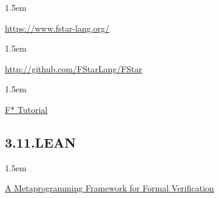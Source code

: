 \documentclass[12pt,twoside]{article}
\begin{document}
\begin{mddefinitions}%


\begin{mdbmarginx}{}{}{}{1.5em}%
\begin{mddefdata}%
\href{https://www.fstar-lang.org/}{{\ttfamily https://\hspace{0pt}www.\hspace{0pt}fstar-\hspace{0pt}lang.\hspace{0pt}org/\hspace{0pt}}}
\end{mddefdata}%
\end{mdbmarginx}%


\begin{mdbmarginx}{}{}{}{1.5em}%
\begin{mddefdata}%
\href{http://github.com/FStarLang/FStar}{{\ttfamily http://\hspace{0pt}github.\hspace{0pt}com/\hspace{0pt}FStarLang/\hspace{0pt}FStar}}
\end{mddefdata}%
\end{mdbmarginx}%


\begin{mdbmarginx}{}{}{}{1.5em}%
\begin{mddefdata}%
\href{https://www.fstar-lang.org/tutorial/}{F* Tutorial}%
\end{mddefdata}%
\end{mdbmarginx}%
\end{mddefinitions}%

\subsection{3.11.\hspace*{0.5em}LEAN}\label{sec-lean}%

\begin{mddefinitions}%


\begin{mdbmarginx}{}{}{}{1.5em}%
\begin{mddefdata}%
\href{https://pp.ipd.kit.edu/uploads/publikationen/ebner17meta.pdf}{A Metaprogramming Framework for Formal Verification}%
\end{mddefdata}%
\end{mdbmarginx}%
\end{mddefinitions}%
\end{document}
